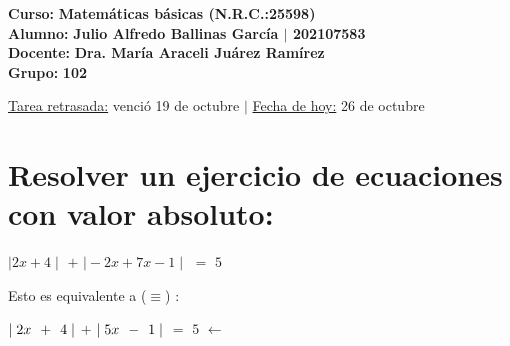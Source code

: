 \documentclass[12pt]{article}
\begin{document}
    \large{\bf{\textsf{Curso:}}} {\bfseries{{\textcolor{brightturquoise}{Matemáticas básicas \bfseries{(N.R.C.:25598)}}}}} \\
    \large{\bf{\textsf{Alumno:}}} {\bfseries{{\textcolor{prussianblue}{Julio Alfredo Ballinas García {\large{{$\mid$}}} 202107583}}}}  \\
    \large{\bf{\textsf{Docente:}}} {\bfseries{{\textcolor{wisteria}{Dra. María Araceli Juárez Ramírez}}}}\\
    \large{\bf{\textsf{Grupo:}}} {\bfseries{{\textcolor{verde_manzana}{102}}}}\\

\vfill
    
\begin{center} 

    {\small{\textsf{\underline{Tarea retrasada:} venció 19 de octubre {}} {\LARGE{ $\mid$ }}\textsf{{\underline{Fecha de hoy:}} 26 de octubre}}}
    
\end{center}

\newpage


\section{\textsf{Resolver un ejercicio de ecuaciones con valor absoluto}:} \vspace{.5cm}

{\LARGE{ \hspace{.1cm} $\mid 2x + 4 \mid$ $+$ $\mid -2x + 7x -1 \mid$ $=$ $5$}} \vspace{.5cm}

{\Large{Esto es equivalente a}} ({\LARGE{$\equiv$}}) {\Large{:}} \vspace{0.5cm}

{\LARGE{ \hspace{.1cm} $\mid 2x \hspace{0.15cm} + \hspace{0.15cm} 4 \mid$ \hspace{0.15cm} $+$ \hspace{0.15cm} $\mid 5x \hspace{0.15cm} - \hspace{0.15cm}1 \mid$ $=$ $5$}} \hspace{0.2cm} {\Large{$\longleftarrow$}} \hspace{0.0005cm} {} \vspace{0.5cm}
\end{document}
